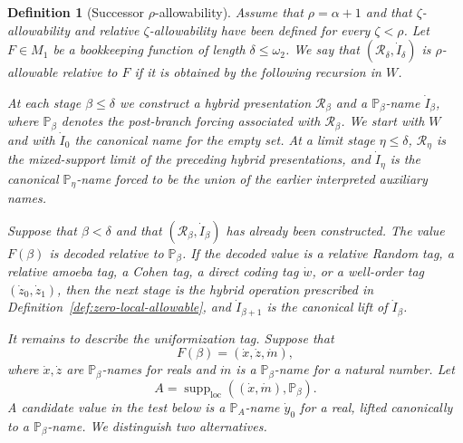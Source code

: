 \documentclass[10pt,a4paper]{amsart}
\newtheorem{definition}{Definition}
\begin{document}
\begin{definition}[Successor \(\rho\)-allowability]
\label{def:rho-allowable-local}
Assume that \(\rho=\alpha+1\) and that \(\zeta\)-allowability and relative
\(\zeta\)-allowability have been defined for every \(\zeta<\rho\).  Let
\(F\in M_1\) be a bookkeeping function of length \(\delta\leq\omega_2\).  We
say that \((\mathcal R_\delta,\dot I_\delta)\) is \emph{\(\rho\)-allowable
relative to \(F\)} if it is obtained by the following recursion in \(W\).

At each stage \(\beta\leq\delta\) we construct a hybrid presentation
\(\mathcal R_\beta\) and a \(\mathbb P_\beta\)-name \(\dot I_\beta\), where
\(\mathbb P_\beta\) denotes the post-branch forcing associated with
\(\mathcal R_\beta\).
We start with $W$ and with \(\dot I_0\) the
canonical name for the empty set.  At a limit stage \(\eta\leq\delta\),
\(\mathcal R_\eta\) is the mixed-support limit of the preceding hybrid
presentations, and \(\dot I_\eta\) is the canonical \(\mathbb P_\eta\)-name
forced to be the union of the earlier interpreted auxiliary names.

Suppose that \(\beta<\delta\) and that \((\mathcal R_\beta,\dot I_\beta)\) has
already been constructed.  The value \(F(\beta)\) is decoded relative to
\(\mathbb P_\beta\).  If the decoded value is a relative Random tag, a relative amoeba tag, a Cohen
tag, a direct coding tag \(\dot w\), or a well-order tag
\((\dot z_0,\dot z_1)\), then the next stage is the hybrid operation
prescribed in Definition~\ref{def:zero-local-allowable}, and
\(\dot I_{\beta+1}\) is the canonical lift of \(\dot I_\beta\).

It remains to describe the uniformization tag.  Suppose that
\[
   F(\beta)=(\dot x,\dot z,\dot m),
\]
where \(\dot x,\dot z\) are \(\mathbb P_\beta\)-names for reals and \(\dot m\)
is a \(\mathbb P_\beta\)-name for a natural number.  Let
\[
   A=\operatorname{supp}_{\mathrm{loc}}((\dot x,\dot m),\mathbb P_\beta).
\]
A candidate value in the test below is a \(\mathbb P_A\)-name \(\dot y_0\) for
a real, lifted canonically to a \(\mathbb P_\beta\)-name.  We distinguish two
alternatives.


\end{definition}
\end{document}
